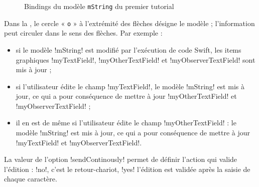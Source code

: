 \newcommand\FondModele{LightGray!25}

\newcommand\Modele[4]{
  \SetVertexNormal[Shape=rectangle, LineColor=black, FillColor=\FondModele, LineWidth=1pt]
  \Vertex[x=#3, y=#4, L={\tt #2}]{#1}
}

\newcommand\ItemGraphique[4]{
  \SetVertexNormal[Shape=rectangle, LineColor=blue, FillColor=\FondModele, LineWidth=1pt]
  \Vertex[x=#3, y=#4, L={\tt #2}]{#1}
}

\newcommand\Fleche[4]{
  \draw [#1, thick, black] (#2) edge[#4] (#3) ;
}

\begin{figure}[t]
  \centering
  \small
  \caption{Bindings du modèle \texttt{mString} du premier tutorial}
  \ligne
\end{figure}

Dans la , le cercle « \texttt{o} » à l'extrémité des flèches désigne le modèle ; l'information peut circuler dans le sens des flèches. Par exemple :
\begin{itemize}
  \item si le modèle \eb!mString! est modifié par l'exécution de code Swift, les items graphiques \eb!myTextField!, \eb!myOtherTextField! et \eb!myObserverTextField! sont mis à jour ;
  \item si l'utilisateur édite le champ \eb!myTextField!, le modèle \eb!mString! est mis à jour, ce qui a pour conséquence de mettre à jour \eb!myOtherTextField! et \eb!myObserverTextField! ;
  \item il en est de même si l'utilisateur édite le champ \eb!myOtherTextField! : le modèle \eb!mString! est mis à jour, ce qui a pour conséquence de mettre à jour \eb!myTextField! et \eb!myObserverTextField!.
\end{itemize}

La valeur de l'option \eb!sendContinously! permet de définir l'action qui valide l'édition : \eb!no!, c'est le retour-chariot, \eb!yes! l'édition est validée après la saisie de chaque caractère.



